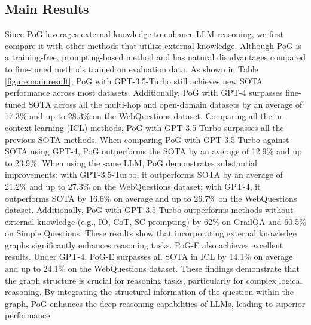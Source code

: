 \subsection{Main Results}
Since PoG leverages external knowledge to enhance LLM reasoning, we first compare it with other methods that utilize external knowledge. 
Although PoG is a training-free, prompting-based method and has natural disadvantages compared to fine-tuned methods trained on evaluation data.
As shown in Table \ref{figure:mainresult}, PoG with GPT-3.5-Turbo still achieves new SOTA performance across most datasets. 
Additionally, PoG with GPT-4 surpasses fine-tuned SOTA across all the multi-hop and open-domain datasets by an average of 17.3\% and up to 28.3\% on the WebQuestions dataset.
Comparing all the in-context learning (ICL) methods, 
PoG with GPT-3.5-Turbo surpasses all the previous SOTA methods. 
When comparing PoG with GPT-3.5-Turbo against SOTA using GPT-4, PoG outperforms the SOTA by an average of 12.9\% and up to 23.9\%. 
When using the same LLM, PoG demonstrates substantial improvements: 
with GPT-3.5-Turbo, it outperforms SOTA by an average of 21.2\% and up to 27.3\% on the WebQuestions dataset;
with GPT-4, it outperforms SOTA by 16.6\% on average and up to 26.7\% on the WebQuestions dataset.
Additionally, PoG with GPT-3.5-Turbo outperforms methods without external knowledge (e.g., IO, CoT, SC prompting) by 62\% on GrailQA and 60.5\% on Simple Questions. These results show that incorporating external knowledge graphs significantly enhances reasoning tasks.
PoG-E also achieves excellent results. Under GPT-4, PoG-E surpasses all SOTA in ICL by 14.1\% on average and up to 24.1\% on the WebQuestions dataset. These findings demonstrate that the graph structure is crucial for reasoning tasks, particularly for complex logical reasoning. By integrating the structural information of the question within the graph, PoG enhances the deep reasoning capabilities of LLMs, leading to superior performance.
